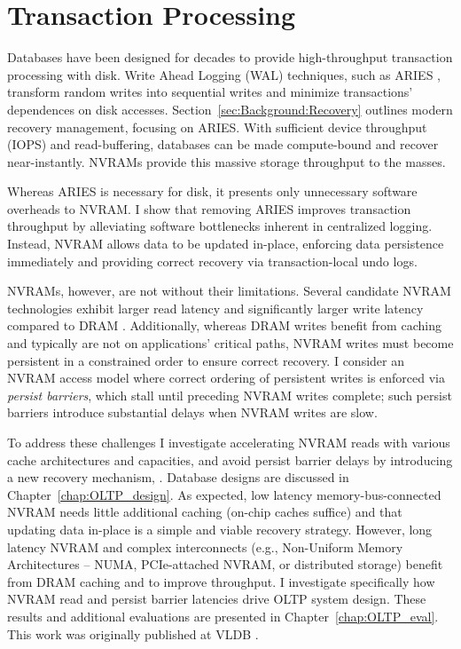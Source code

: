 \section{Transaction Processing}
\label{sec:Intro:OLTP}

Databases have been designed for decades to provide high-throughput transaction processing with disk.
Write Ahead Logging (WAL) techniques, such as ARIES \cite{MohanHaderle92}, transform random writes into sequential writes and minimize transactions' dependences on disk accesses.
Section~\ref{sec:Background:Recovery} outlines modern recovery management, focusing on ARIES.
With sufficient device throughput (IOPS) and read-buffering, databases can be made compute-bound and recover near-instantly.
NVRAMs provide this massive storage throughput to the masses.

Whereas ARIES is necessary for disk, it presents only unnecessary software overheads to NVRAM.
I show that removing ARIES improves transaction throughput by alleviating software bottlenecks inherent in centralized logging.
Instead, NVRAM allows data to be updated in-place, enforcing data persistence immediately and providing correct recovery via transaction-local undo logs.

NVRAMs, however, are not without their limitations.
Se\-veral candidate NVRAM technologies exhibit larger read latency and significantly larger write latency compared to DRAM \cite{BurrKurdi08}.
Additionally, whereas DRAM writes benefit from caching and typically are not on applications' critical paths, NVRAM writes must become persistent in a constrained order to ensure correct recovery.
I consider an NVRAM access model where correct ordering of persistent writes is enforced via \emph{persist barriers}, which stall until preceding NVRAM writes complete; such persist barriers introduce substantial delays when NVRAM writes are slow.

To address these challenges I investigate accelerating NVRAM reads with various cache architectures and capacities, and avoid persist barrier delays by introducing a new recovery mechanism, \GroupCommit.
Database designs are discussed in Chapter~\ref{chap:OLTP_design}.
As expected, low latency memory-bus-connected NVRAM needs little additional caching (on-chip caches suffice) and that updating data in-place is a simple and viable recovery strategy.
However, long latency NVRAM and complex interconnects (e.g., Non-Uniform Memory Architectures -- NUMA, PCIe-attached NVRAM, or distributed storage) benefit from DRAM caching and \GroupCommit to improve throughput.
I investigate specifically how NVRAM read and persist barrier latencies drive OLTP system design.
These results and additional evaluations are presented in Chapter~\ref{chap:OLTP_eval}.
This work was originally published at VLDB \cite{Pelley13}.

